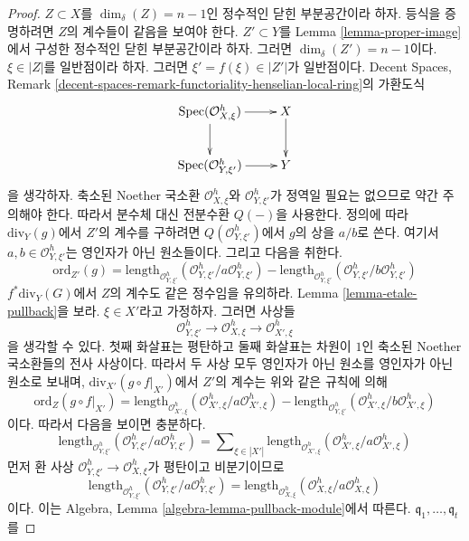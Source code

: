 \begin{proof}
\medskip\noindent
$Z \subset X$를 $\dim_\delta(Z) = n - 1$인 정수적인 닫힌
부분공간이라 하자. 등식을 증명하려면 $Z$의 계수들이 같음을 보여야 한다.
$Z' \subset Y$를 Lemma \ref{lemma-proper-image}에서 구성한 정수적인
닫힌 부분공간이라 하자. 그러면 $\dim_\delta(Z') = n - 1$이다.
$\xi \in |Z|$를 일반점이라 하자. 그러면
$\xi' = f(\xi) \in |Z'|$가 일반점이다. Decent Spaces, Remark
\ref{decent-spaces-remark-functoriality-henselian-local-ring}의 가환도식
$$
\xymatrix{
\Spec(\mathcal{O}_{X, \xi}^h) \ar[r] \ar[d] & X \ar[d] \\
\Spec(\mathcal{O}_{Y, \xi'}^h) \ar[r] & Y
}
$$
을 생각하자. 축소된 Noether 국소환
$\mathcal{O}_{X, \xi}^h$와 $\mathcal{O}_{Y, \xi'}^h$가 정역일
필요는 없으므로 약간 주의해야 한다. 따라서 분수체 대신 전분수환
$Q(-)$을 사용한다. 정의에 따라 $\text{div}_Y(g)$에서 $Z'$의 계수를
구하려면 $Q(\mathcal{O}_{Y, \xi'}^h)$에서 $g$의 상을
$a/b$로 쓴다. 여기서 $a, b \in \mathcal{O}_{Y, \xi'}^h$는
영인자가 아닌 원소들이다. 그리고 다음을 취한다.
$$
\text{ord}_{Z'}(g) =
\text{length}_{\mathcal{O}_{Y, \xi'}^h}
(\mathcal{O}_{Y, \xi'}^h/a \mathcal{O}_{Y, \xi'}^h) -
\text{length}_{\mathcal{O}_{Y, \xi'}^h}
(\mathcal{O}_{Y, \xi'}^h/b \mathcal{O}_{Y, \xi'}^h)
$$
$f^*\text{div}_Y(G)$에서 $Z$의 계수도 같은 정수임을 유의하라.
Lemma \ref{lemma-etale-pullback}을 보라. $\xi \in X'$라고 가정하자.
그러면 사상들
$$
\mathcal{O}_{Y, \xi'}^h \to
\mathcal{O}_{X, \xi}^h \to
\mathcal{O}_{X', \xi}^h
$$
을 생각할 수 있다. 첫째 화살표는 평탄하고 둘째 화살표는 차원이
$1$인 축소된 Noether 국소환들의 전사 사상이다. 따라서 두 사상 모두
영인자가 아닌 원소를 영인자가 아닌 원소로 보내며,
$\text{div}_{X'}(g \circ f|_{X'})$에서 $Z'$의 계수는
위와 같은 규칙에 의해
$$
\text{ord}_Z(g \circ f|_{X'}) =
\text{length}_{\mathcal{O}_{X', \xi}^h}
(\mathcal{O}_{X', \xi}^h/a \mathcal{O}_{X', \xi}^h) -
\text{length}_{\mathcal{O}_{Y, \xi'}^h}
(\mathcal{O}_{X', \xi}^h/b \mathcal{O}_{X', \xi}^h)
$$
이다. 따라서 다음을 보이면 충분하다.
$$
\text{length}_{\mathcal{O}_{Y, \xi'}^h}
(\mathcal{O}_{Y, \xi'}^h/a \mathcal{O}_{Y, \xi'}^h) =
\sum\nolimits_{\xi \in |X'|}
\text{length}_{\mathcal{O}_{X', \xi}^h}
(\mathcal{O}_{X', \xi}^h/a \mathcal{O}_{X', \xi}^h)
$$
먼저 환 사상
$\mathcal{O}_{Y, \xi'}^h \to \mathcal{O}_{X, \xi}^h$가 평탄이고
비분기이므로
$$
\text{length}_{\mathcal{O}_{Y, \xi'}^h}
(\mathcal{O}_{Y, \xi'}^h/a \mathcal{O}_{Y, \xi'}^h) =
\text{length}_{\mathcal{O}_{X, \xi}^h}
(\mathcal{O}_{X, \xi}^h/a \mathcal{O}_{X, \xi}^h)
$$
이다. 이는 Algebra, Lemma \ref{algebra-lemma-pullback-module}에서 따른다.
$\mathfrak q_1, \ldots, \mathfrak q_t$를

\end{proof}
